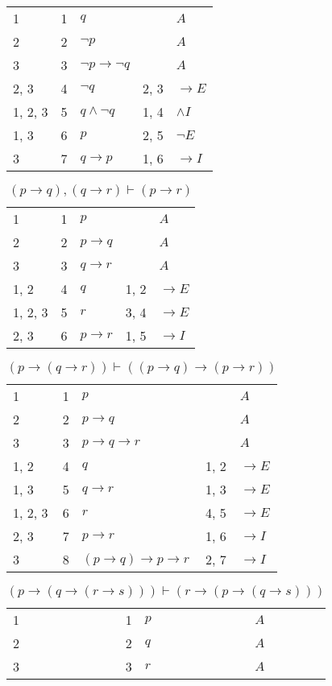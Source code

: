 \documentclass{article}
\begin{document}
\begin{table}[htbp]
\begin{tabular}{lrlll}
{1} & 1 & $q$ & {} & $A$ \\
{2} & 2 & $¬p$ & {} & $A$ \\
{3} & 3 & $¬p→ ¬q$ & {} & $A$ \\
{2, 3} & 4 & $¬q$ & {2, 3} & $→E$ \\
{1, 2, 3} & 5 & $q∧ ¬q$ & {1, 4} & $∧I$ \\
{1, 3} & 6 & $p$ & {2, 5} & $¬E$ \\
{3} & 7 & $q→p$ & {1, 6} & $→I$ \\
\end{tabular}
\end{table}\begin{table}[htbp]\caption*{$(p → q),(q → r) ⊢ (p → r)$}\centering\begin{tabular}{lrlll}
{1} & 1 & $p$ & {} & $A$ \\
{2} & 2 & $p→q$ & {} & $A$ \\
{3} & 3 & $q→r$ & {} & $A$ \\
{1, 2} & 4 & $q$ & {1, 2} & $→E$ \\
{1, 2, 3} & 5 & $r$ & {3, 4} & $→E$ \\
{2, 3} & 6 & $p→r$ & {1, 5} & $→I$ \\
\end{tabular}
\end{table}\begin{table}[htbp]\caption*{$(p → (q → r)) ⊢ ((p → q) → (p → r))$}\centering\begin{tabular}{lrlll}
{1} & 1 & $p$ & {} & $A$ \\
{2} & 2 & $p→q$ & {} & $A$ \\
{3} & 3 & $p→q→r$ & {} & $A$ \\
{1, 2} & 4 & $q$ & {1, 2} & $→E$ \\
{1, 3} & 5 & $q→r$ & {1, 3} & $→E$ \\
{1, 2, 3} & 6 & $r$ & {4, 5} & $→E$ \\
{2, 3} & 7 & $p→r$ & {1, 6} & $→I$ \\
{3} & 8 & $(p→q)→p→r$ & {2, 7} & $→I$ \\
\end{tabular}
\end{table}\begin{table}[htbp]\caption*{$(p → (q → (r → s))) ⊢ (r → (p → (q → s)))$}\centering\begin{tabular}{lrlll}
{1} & 1 & $p$ & {} & $A$ \\
{2} & 2 & $q$ & {} & $A$ \\
{3} & 3 & $r$ & {} & $A$ \\

\end{tabular}
\end{table}
\end{document}
